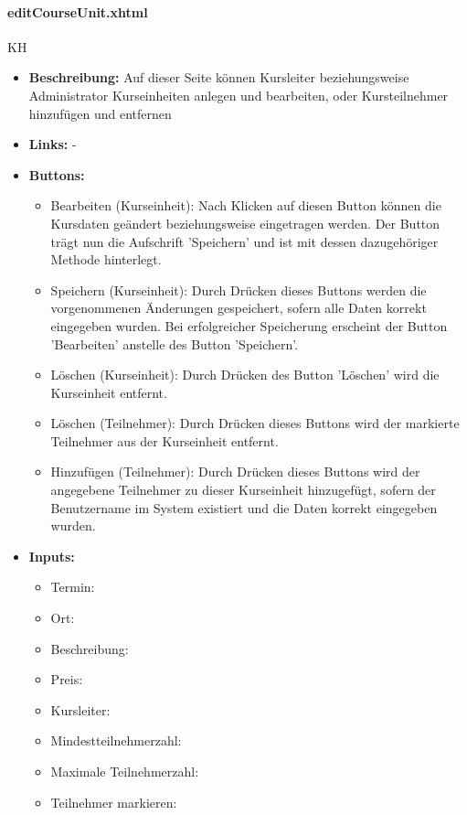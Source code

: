 				\paragraph{editCourseUnit.xhtml}
					KH\\
					\begin{itemize}
						\item \textbf{Beschreibung:} Auf dieser Seite können Kursleiter beziehungsweise Administrator Kurseinheiten anlegen und bearbeiten, oder Kursteilnehmer hinzufügen und entfernen
						\item \textbf{Links:} -
						\item \textbf{Buttons:}
							\begin{itemize}
								\item Bearbeiten (Kurseinheit): Nach Klicken auf diesen Button können die Kursdaten geändert beziehungsweise eingetragen werden. Der Button trägt nun die Aufschrift 'Speichern' und ist mit dessen dazugehöriger Methode hinterlegt.
								\item Speichern (Kurseinheit): Durch Drücken dieses Buttons werden die vorgenommenen Änderungen gespeichert, sofern alle Daten korrekt eingegeben wurden. Bei erfolgreicher Speicherung erscheint der Button 'Bearbeiten' anstelle des Button 'Speichern'.
								\item Löschen (Kurseinheit): Durch Drücken des Button 'Löschen' wird die Kurseinheit entfernt.
								\item Löschen (Teilnehmer): Durch Drücken dieses Buttons wird der markierte Teilnehmer aus der Kurseinheit entfernt.
								\item Hinzufügen (Teilnehmer): Durch Drücken dieses Buttons wird der angegebene Teilnehmer zu dieser Kurseinheit hinzugefügt, sofern der Benutzername im System existiert und die Daten korrekt eingegeben wurden.
							\end{itemize}
						\item \textbf{Inputs:}
							\begin{itemize}
								\item Termin:
								\item Ort:
								\item Beschreibung:
								\item Preis:
								\item Kursleiter:
								\item Mindestteilnehmerzahl:
								\item Maximale Teilnehmerzahl:
								\item Teilnehmer markieren:

\end{itemize}
\end{itemize}
